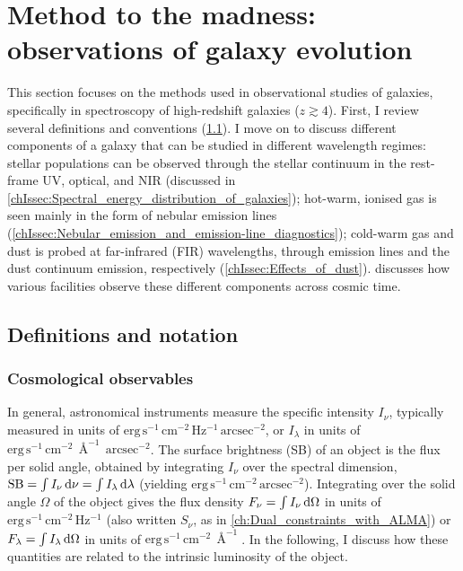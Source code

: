 \section{Method to the madness: observations of galaxy evolution}
\label{chIsec:Observational_methods}

This section focuses on the methods used in observational studies of galaxies, specifically in spectroscopy of high-redshift galaxies ($z \gtrsim 4$). First, I review several definitions and conventions (\cref{chIssec:Definitions_and_notation}). I move on to discuss different components of a galaxy that can be studied in different wavelength regimes: stellar populations can be observed through the stellar continuum in the rest-frame UV, optical, and NIR (discussed in \cref{chIssec:Spectral_energy_distribution_of_galaxies}); hot-warm, ionised gas is seen mainly in the form of nebular emission lines (\cref{chIssec:Nebular_emission_and_emission-line_diagnostics}); cold-warm gas and dust is probed at far-infrared (FIR) wavelengths, through emission lines and the dust continuum emission, respectively (\cref{chIssec:Effects_of_dust}).  discusses how various facilities observe these different components across cosmic time.

\subsection{Definitions and notation}
\label{chIssec:Definitions_and_notation}

\subsubsection{Cosmological observables}
\label{chIsssec:Cosmological_observables}

In general, astronomical instruments measure the specific intensity $I_\nu$, typically measured in units of $\mathrm{erg \, s^{-1} \, cm^{-2} \, Hz^{-1} \, arcsec^{-2}}$, or $I_\lambda$ in units of $\mathrm{erg \, s^{-1} \, cm^{-2} \, \Angstrom^{-1} \, arcsec^{-2}}$. The surface brightness (SB) of an object is the flux per solid angle, obtained by integrating $I_\nu$ over the spectral dimension, $\text{SB} = \int I_\nu \dif \nu = \int I_\lambda \dif \lambda$ (yielding $\mathrm{erg \, s^{-1} \, cm^{-2} \, arcsec^{-2}}$). Integrating over the solid angle $\Omega$ of the object gives the flux density $F_\nu = \int I_\nu \dif \Omega$ in units of $\mathrm{erg \, s^{-1} \, cm^{-2} \, Hz^{-1}}$ (also written $S_\nu$, as in \cref{ch:Dual_constraints_with_ALMA}) or $F_\lambda = \int I_\lambda \dif \Omega$ in units of $\mathrm{erg \, s^{-1} \, cm^{-2} \, \Angstrom^{-1}}$. In the following, I discuss how these quantities are related to the intrinsic luminosity of the object.

